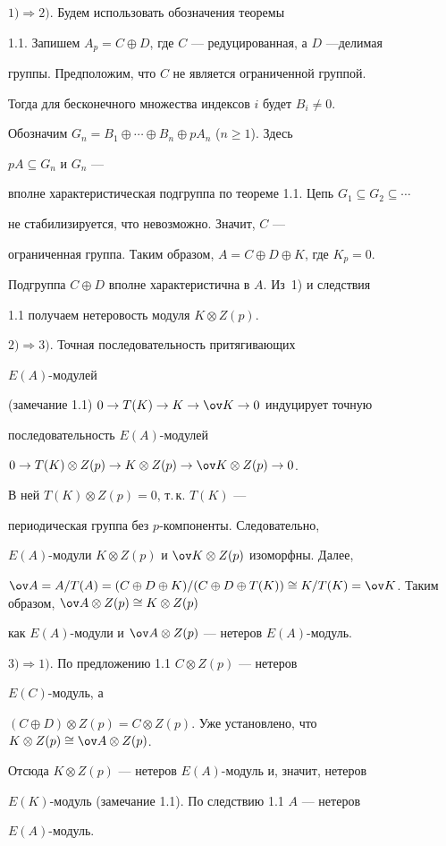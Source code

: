 \begin{pf} 


$1)\Rightarrow 2)$. Будем использовать обозначения теоремы 


1.1. Запишем $A_p=C\oplus D$, где $C$ --- редуцированная, а $D$ ---делимая 


группы. Предположим, что $C$ не является ограниченной группой. 


Тогда для бесконечного множества индексов $i$ будет $B_i\ne0$. 


Обозначим $G_n=B_1\oplus\dotsb\oplus B_n\oplus pA_n$ ($n\ge1$). Здесь 


$pA\subseteq G_n$ и $G_n$ --- 


вполне характеристическая подгруппа по теореме 1.1. Цепь $G_1\subseteq 


G_2\subseteq\dotsb$ 


не стабилизируется, что невозможно. Значит, $C$ --- 


ограниченная группа. Таким образом, $A=C\oplus D\oplus K$, где $K_p=0$. 


Подгруппа $C\oplus D$ вполне характеристична в $A$. Из~1) и следствия 


1.1 получаем нетеровость модуля $K\otimes Z(p)$. 


 


$2)\Rightarrow 3)$. Точная последовательность притягивающих 


$E(A)$-модулей 


(замечание 1.1) $0\to T(K)\to K\to\ov K\to 0$ индуцирует точную 


последовательность $E(A)$-модулей 


$0\to T(K)\otimes Z(p)\to K\otimes Z(p)\to\ov K\otimes Z(p)\to0$. 


В ней $T(K)\otimes Z(p)=0$, т.\,к. $T(K)$ --- 


периодическая группа без $p$-компоненты. Следовательно, 


$E(A)$-модули $K\otimes Z(p)$ и $\ov K\otimes Z(p)$ изоморфны. Далее, 


$\ov A=A/T(A)=(C\oplus D\oplus K)/(C\oplus D\oplus T(K))\cong K/T(K)=\ov 


K$. Таким образом, $\ov A\otimes Z(p)\cong K\otimes Z(p)$ 


как $E(A)$-модули и $\ov A\otimes Z(p)$ --- нетеров $E(A)$-модуль. 


 


$3)\Rightarrow 1)$. По предложению 1.1\; $C\otimes Z(p)$ --- нетеров 


$E(C)$-модуль, а 


$(C\oplus D)\otimes Z(p)=C\otimes Z(p)$. Уже установлено, что $K\otimes 


Z(p)\cong\ov A\otimes Z(p)$. 


Отсюда $K\otimes Z(p)$ --- нетеров $E(A)$-модуль и, значит, нетеров 


$E(K)$-модуль (замечание 1.1). По следствию 1.1\; $A$ --- нетеров 


$E(A)$-модуль. 


\end{pf} 


